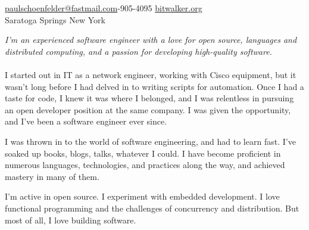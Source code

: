 \documentclass[10pt,a4paper]{article}
\begin{document}
\sloppy  %



\nobreakvspace{0.3em}  %

\noindent\href{mailto:paulschoenfelder@fastmail.com.com}{paulschoenfelder\mbox{}@\mbox{}fastmail.com}-905-4095\sbull
\href{http://bitwalker.org}{bitwalker.org}
\\
Saratoga Springs\sbull
New York

\spacedhrule{0.9em}{-0.4em}  %


\vspace{-1.3em}  %
\begin{multicols}{2}  %
\noindent \emph{I'm an experienced software engineer with a love for open source, languages and distributed computing, and a passion for developing high-quality software.}
\\
\\
I started out in IT as a network engineer, working with Cisco equipment, but it wasn't long before I had delved in to writing scripts for automation. Once I had a taste for code, I knew it was where I belonged, and I was relentless in pursuing an open developer position at the same company. I was given the opportunity, and I've been a software engineer ever since.

I was thrown in to the world of software engineering, and had to learn fast. I've soaked up books, blogs, talks, whatever I could. I have become proficient in numerous languages, technologies, and practices along the way, and achieved mastery in many of them.

I'm active in open source. I experiment with embedded development. I love functional programming and the challenges of concurrency and distribution. But most of all, I love building software.
\end{multicols}


\spacedhrule{0em}{-0.4em}
\end{document}
